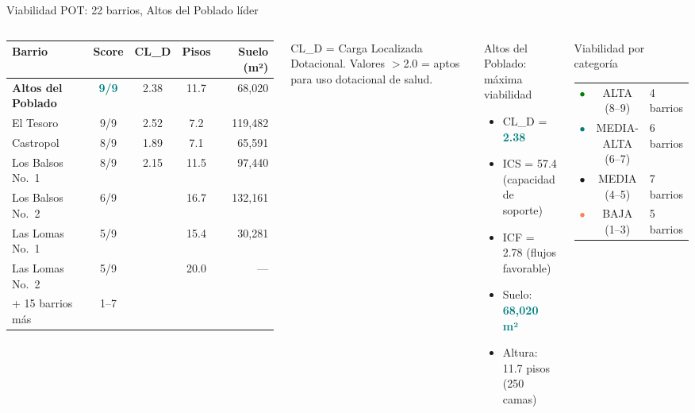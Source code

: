\documentclass[aspectratio=169, 11pt]{beamer}
\newcommand{\highlight}[1]{\textcolor{teal}{\textbf{#1}}}
\newcommand{\src}[1]{\par\vspace{2pt}{\tiny\textcolor{slate}{Fuente: #1}}}
\begin{document}
\begin{frame}{Viabilidad POT: 22 barrios, Altos del Poblado líder}

\begin{columns}[T]
{\scriptsize
\begin{tabular}{@{}lcccr@{}}
\toprule
\textbf{Barrio} & \textbf{Score} & \textbf{CL\_D} & \textbf{Pisos} & \textbf{Suelo (m²)} \\
\midrule
\rowcolor{teal!10}
\textbf{Altos del Poblado} & \highlight{9/9} & 2.38 & 11.7 & 68,020 \\
\rowcolor{teal!6}
El Tesoro & 9/9 & 2.52 & 7.2 & 119,482 \\
Castropol & 8/9 & 1.89 & 7.1 & 65,591 \\
Los Balsos No.\ 1 & 8/9 & 2.15 & 11.5 & 97,440 \\
\midrule
Los Balsos No.\ 2 & 6/9 & & 16.7 & 132,161 \\
Las Lomas No.\ 1 & 5/9 & & 15.4 & 30,281 \\
Las Lomas No.\ 2 & 5/9 & & 20.0 & --- \\
\midrule
{\tiny + 15 barrios más} & 1--7 & & & \\
\bottomrule
\end{tabular}
}

\src{POT Batería Indicadores (3ciz-tpgr), Acuerdo 48 de 2014}

\vspace{4pt}
{\footnotesize CL\_D = Carga Localizada Dotacional. Valores $>$2.0 = aptos para uso dotacional de salud.}

\begin{exampleblock}{\small Altos del Poblado: máxima viabilidad}
\footnotesize
\begin{itemize}
  \item CL\_D = \highlight{2.38}
  \item ICS = 57.4 (capacidad de soporte)
  \item ICF = 2.78 (flujos favorable)
  \item Suelo: \highlight{68,020 m²}
  \item Altura: 11.7 pisos (250 camas)
\end{itemize}
\end{exampleblock}

\vspace{4pt}
\begin{block}{\small Viabilidad por categoría}
\footnotesize
\begin{tabular}{@{}lcl@{}}
\textcolor{green}{$\bullet$} & ALTA (8--9) & 4 barrios \\
\textcolor{teal}{$\bullet$} & MEDIA-ALTA (6--7) & 6 barrios \\
\textcolor{amber}{$\bullet$} & MEDIA (4--5) & 7 barrios \\
\textcolor{coral}{$\bullet$} & BAJA (1--3) & 5 barrios \\
\end{tabular}
\end{block}


\end{columns}
\end{frame}
\end{document}
